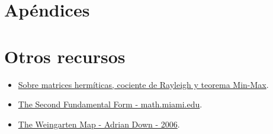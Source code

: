 \documentclass[nochap]{apuntes}
\begin{document}
\appendix
\chapter{Apéndices}

\chapter{Otros recursos}
\begin{itemize}
\item \href{http://math.nyu.edu/~nica/hermitian.pdf}{Sobre matrices hermíticas, cociente de Rayleigh y teorema Min-Max}.
\item \href{http://www.math.miami.edu/~galloway/dgnotes/chpt5.pdf}{The Second Fundamental Form - math.miami.edu}.
\item \href{http://people.duke.edu/~ad159/files/m140/19.pdf}{The Weingarten Map - Adrian Down - 2006}.
\end{itemize}

\printindex
\end{document}
